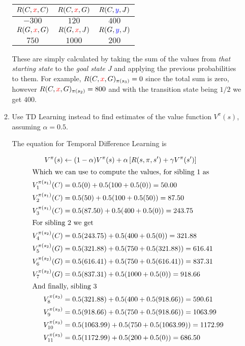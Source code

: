 \documentclass[12pt]{article}
\begin{document}
\begin{enumerate}
\begin{enumerate}
    \begin{table}[H]
      \centering
      \begin{tabular}{c | c | c}
        \hline\hline
        $R(C,{\color{red}{x}},C)$ & $R(C,{\color{red}{x}},G)$ & $R(C,{\color{blue}{y}},J)$\\
        \hline
        $-300$ & $120$ & $400$\\
        \hline
        $R(G,{\color{red}{x}},G)$ & $R(G,{\color{red}{x}},J)$ & $R(G,{\color{blue}{y}},J)$\\
        \hline
        $750$ & $1000$ & $200$\\
        \hline\hline
       \end{tabular}
      \end{table}

      These are simply calculated by taking the sum of the values from {\em that starting state} to the {\em goal state $J$} and applying the previous probabilities to them. For example, $R(C,{\color{red}{x}},G)_{\pi(s_{3})} = 0$ since the total sum is zero, however $R(C,{\color{red}{x}},G)_{\pi(s_{2})} = 800$ and with the transition state being $1/2$ we get $400$.


  \item Use TD Learning instead to find estimates of the value
    function $V^{\pi}(s)$, assuming $\alpha=0.5$.

    The equation for Temporal Difference Learning is

    \begin{align*}
      V^{\pi}(s) &\leftarrow (1 - \alpha)V^{\pi}(s) + \alpha\left[R(s,\pi,s^{\prime}) + \gamma V^{\pi}(s^{\prime})\right]\\
      \intertext{Which we can use to compute the values, for sibling 1 as}
      V_{1}^{\pi(s_{1})}(C) &= 0.5(0) + 0.5(100 + 0.5(0)) = 50.00\\
      V_{2}^{\pi(s_{1})}(C) &= 0.5(50) + 0.5(100 + 0.5(50)) = 87.50\\
      V_{3}^{\pi(s_{1})}(C) &= 0.5(87.50) + 0.5(400 + 0.5(0)) = 243.75\\
      \intertext{For sibling 2 we get}
      V_{4}^{\pi(s_{2})}(C) &= 0.5(243.75) + 0.5(400 + 0.5(0)) = 321.88\\
      V_{5}^{\pi(s_{2})}(G) &= 0.5(321.88) + 0.5(750 + 0.5(321.88)) = 616.41\\
      V_{6}^{\pi(s_{2})}(G) &= 0.5(616.41) + 0.5(750 + 0.5(616.41)) = 837.31\\
      V_{7}^{\pi(s_{2})}(G) &= 0.5(837.31) + 0.5(1000 + 0.5(0)) = 918.66\\
      \intertext{And finally, sibling 3}
      V_{8}^{\pi(s_{3})} &= 0.5(321.88) + 0.5(400 + 0.5(918.66)) = 590.61\\
      V_{9}^{\pi(s_{3})} &= 0.5(918.66) + 0.5(750 + 0.5(918.66)) = 1063.99\\
      V_{10}^{\pi(s_{3})} &= 0.5(1063.99) + 0.5(750 + 0.5(1063.99)) = 1172.99\\
      V_{11}^{\pi(s_{3})} &= 0.5(1172.99) + 0.5(200 + 0.5(0)) = 686.50
    \end{align*}

  \end{enumerate}

\end{enumerate}
\end{document}
